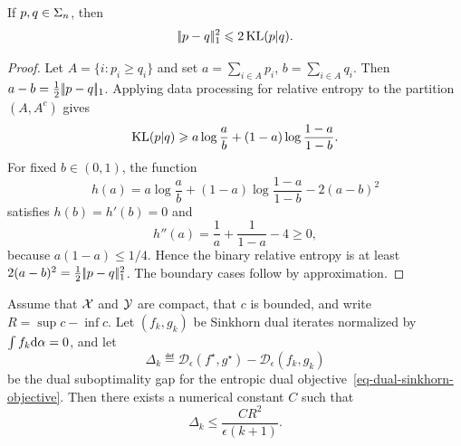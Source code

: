 \begin{prop}\label{prop-pinsker}
	If $p,q\in\Sigma_n$, then
	\[
		|\!| p-q |\!|_1^2 \leqslant 2\operatorname{KL}(p|q).
	\]
\end{prop}
\begin{proof}
	Let $A=\{i:p_i\geq q_i\}$ and set $a=\sum_{i\in A}p_i$, $b=\sum_{i\in A}q_i$. Then $a-b=\frac12|\!| p-q |\!|_1$. Applying data processing for relative entropy to the partition $(A,A^c)$ gives
	\[
		\operatorname{KL}(p|q)
		\geqslant
		a\log\frac{a}{b}+(1-a)\log\frac{1-a}{1-b}.
	\]
	For fixed $b\in(0,1)$, the function
	\[
		h(a)=a\log\frac{a}{b}+(1-a)\log\frac{1-a}{1-b}-2(a-b)^2
	\]
	satisfies $h(b)=h'(b)=0$ and
	\[
		h''(a)=\frac1a+\frac1{1-a}-4\geq0,
	\]
	because $a(1-a)\leq1/4$. Hence the binary relative entropy is at least $2(a-b)^2=\frac12|\!| p-q |\!|_1^2$. The boundary cases follow by approximation.
\end{proof}

\begin{prop}\label{prop-sinkhorn-dual-rate}
	Assume that $\mathcal{X}$ and $\mathcal{Y}$ are compact, that $c$ is bounded, and write $R=\sup c-\inf c$. Let $(f_k,g_k)$ be Sinkhorn dual iterates normalized by $\int f_k\mathrm{d}\alpha=0$, and let
	\[
		\Delta_k
		\eqdef
		\mathcal D_\epsilon(f^\star,g^\star)-\mathcal D_\epsilon(f_k,g_k)
	\]
	be the dual suboptimality gap for the entropic dual objective~\eqref{eq-dual-sinkhorn-objective}. Then there exists a numerical constant $C$ such that
	\[
		\Delta_k \leq \frac{C R^2}{\epsilon(k+1)}.
	\]
\end{prop}

